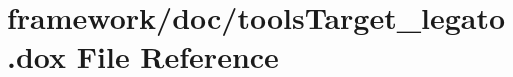 \hypertarget{tools_target__legato_8dox}{}\section{framework/doc/tools\+Target\+\_\+legato.dox File Reference}
\label{tools_target__legato_8dox}
